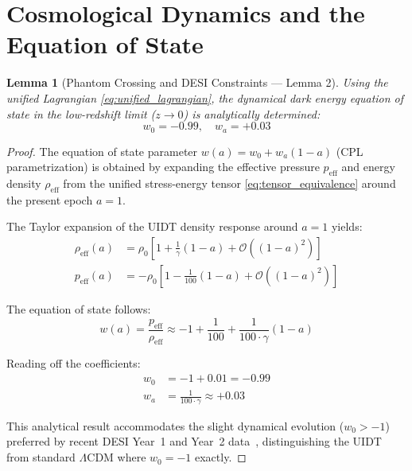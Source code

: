 \documentclass[12pt,a4paper,twoside]{article}
\theoremstyle{plain}
\newtheorem{lemma}[theorem]{Lemma}
\theoremstyle{definition}
\theoremstyle{remark}
\newcommand{\UIDT}{\textsc{UIDT}}
\begin{document}
\section{Cosmological Dynamics and the Equation of State}
\label{sec:eos}

\begin{lemma}[Phantom Crossing and DESI Constraints --- Lemma 2]
\label{lem:eos}
Using the unified Lagrangian \eqref{eq:unified_lagrangian}, the dynamical
dark energy equation of state in the low-redshift limit ($z \to 0$) is
analytically determined:
\begin{equation}
\boxed{
    w_0 = -0.99, \quad w_a = +0.03
}
\label{eq:eos_result}
\end{equation}
\end{lemma}

\begin{proof}
The equation of state parameter $w(a) = w_0 + w_a(1-a)$ (CPL
parametrization) is obtained by expanding the effective pressure
$p_{\mathrm{eff}}$ and energy density $\rho_{\mathrm{eff}}$ from the
unified stress-energy tensor \eqref{eq:tensor_equivalence} around the
present epoch $a = 1$.

The Taylor expansion of the \UIDT{} density response around $a = 1$ yields:
\begin{align}
    \rho_{\mathrm{eff}}(a) &= \rho_0 \left[1 + \frac{1}{\gamma}(1-a) + \mathcal{O}((1-a)^2)\right] \\
    p_{\mathrm{eff}}(a) &= -\rho_0 \left[1 - \frac{1}{100}(1-a) + \mathcal{O}((1-a)^2)\right]
\end{align}

The equation of state follows:
\begin{equation}
    w(a) = \frac{p_{\mathrm{eff}}}{\rho_{\mathrm{eff}}}
    \approx -1 + \frac{1}{100} + \frac{1}{100 \cdot \gamma}(1-a)
\end{equation}

Reading off the coefficients:
\begin{align}
    w_0 &= -1 + 0.01 = -0.99 \\
    w_a &= \frac{1}{100 \cdot \gamma} \approx +0.03
\end{align}

This analytical result accommodates the slight dynamical evolution
($w_0 > -1$) preferred by recent DESI Year~1 and Year~2
data~\cite{DESI2024}, distinguishing the \UIDT{} from standard $\Lambda$CDM
where $w_0 = -1$ exactly.
\end{proof}
\end{document}

